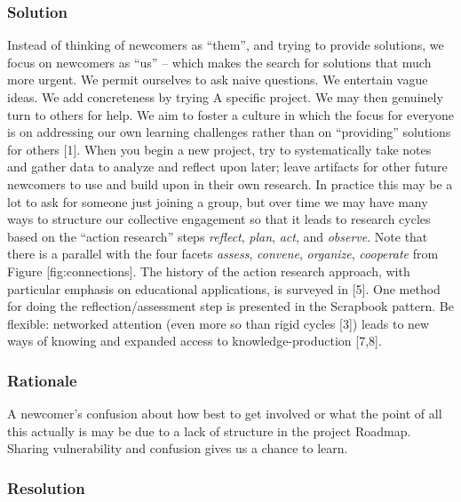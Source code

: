 \hypertarget{solution}{%
\subsubsection{Solution}\label{solution}}

Instead of thinking of newcomers as ``them'', and trying to provide
solutions, we focus on newcomers as ``us'' -- which makes the search for
solutions that much more urgent. We permit ourselves to ask naive
questions. We entertain vague ideas. We add concreteness by trying {{A
specific project}}. We may then genuinely turn to others for help. We
aim to foster a culture in which the focus for everyone is on addressing
our own learning challenges rather than on ``providing'' solutions for
others {{[}1{]}}. When you begin a new project, try to systematically
take notes and gather data to analyze and reflect upon later; leave
artifacts for other future newcomers to use and build upon in their own
research. In practice this may be a lot to ask for someone just joining
a group, but over time we may have many ways to structure our collective
engagement so that it leads to research cycles based on the ``action
research'' steps \emph{reflect}, \emph{plan}, \emph{act}, and
\emph{observe}. Note that there is a parallel with the four facets
\emph{assess}, \emph{convene}, \emph{organize}, \emph{cooperate} from
Figure {[}fig:connections{]}. The history of the action research
approach, with particular emphasis on educational applications, is
surveyed in {{[}5{]}}. One method for doing the reflection/assessment
step is presented in the {{Scrapbook}} pattern. Be flexible: networked
attention (even more so than rigid cycles {{[}3{]}}) leads to new ways
of knowing and expanded access to knowledge-production {{[}7,8{]}}.

\hypertarget{rationale}{%
\subsubsection{Rationale}\label{rationale}}

A newcomer's confusion about how best to get involved or what the point
of all this actually is may be due to a lack of structure in the project
{{Roadmap}}. Sharing vulnerability and confusion gives us a chance to
learn.

\hypertarget{resolution}{%
\subsubsection{Resolution}\label{resolution}}

